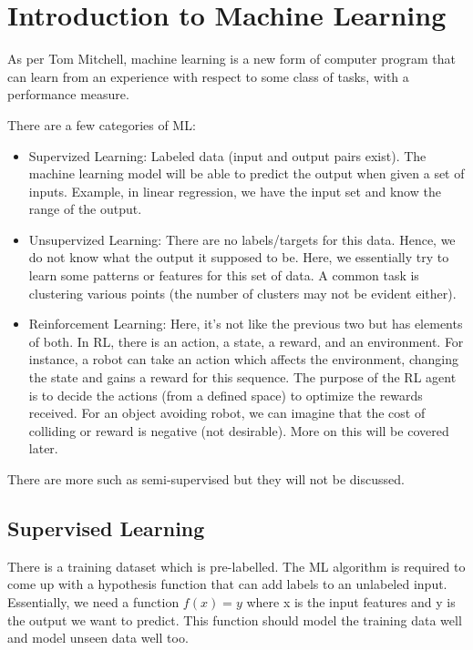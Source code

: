 \chapter{Introduction to Machine Learning}

As per Tom Mitchell, machine learning is a new form of computer program that can learn from an experience with respect to some class of tasks, with a performance measure.

There are a few categories of ML:

\begin{itemize}
    \item Supervized Learning: Labeled data (input and output pairs exist). The machine learning model will be able to predict the output when given a set of inputs. Example, in linear regression, we have the input set and know the range of the output.
    \item Unsupervized Learning: There are no labels/targets for this data. Hence, we do not know what the output it supposed to be. Here, we essentially try to learn some patterns or features for this set of data. A common task is clustering various points (the number of clusters may not be evident either).
    \item Reinforcement Learning: Here, it's not like the previous two but has elements of both. In RL, there is an action, a state, a reward, and an environment. For instance, a robot can take an action which affects the environment, changing the state and gains a reward for this sequence. The purpose of the RL agent is to decide the actions (from a defined space) to optimize the rewards received. For an object avoiding robot, we can imagine that the cost of colliding or reward is negative (not desirable). More on this will be covered later.
\end{itemize}

There are more such as semi-supervised but they will not be discussed.

\section{Supervised Learning}

There is a training dataset which is pre-labelled. The ML algorithm is required to come up with a hypothesis function that can add labels to an unlabeled input. Essentially, we need a function $f(x) = y$ where x is the input features and y is the output we want to predict. This function should model the training data well and model unseen data well too. 

